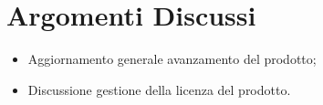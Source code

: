 \section{Argomenti Discussi}
	\begin{itemize}
		\item Aggiornamento generale avanzamento del prodotto;
		\item Discussione gestione della licenza del prodotto.
	\end{itemize}
